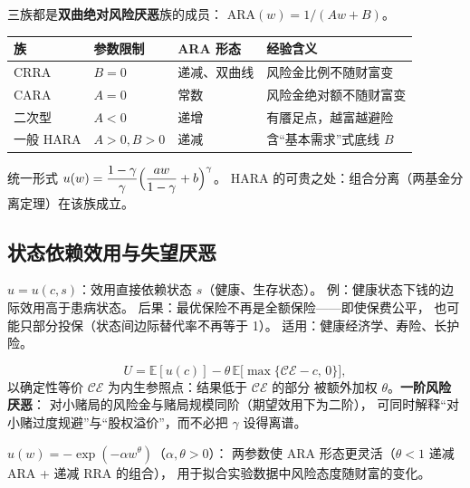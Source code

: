 三族都是\textbf{双曲绝对风险厌恶}族的成员：
$\mathrm{ARA}(w)=1/(Aw+B)$。
\begin{center}
\small
\begin{tabular}{llll}
\toprule
族 & 参数限制 & ARA 形态 & 经验含义 \\
\midrule
CRRA & $B=0$ & 递减、双曲线 & 风险金比例不随财富变 \\
CARA & $A=0$ & 常数 & 风险金绝对额不随财富变 \\
二次型 & $A<0$ & 递增 & 有餍足点，越富越避险 \\
一般 HARA & $A>0,B>0$ & 递减 & 含“基本需求”式底线 $B$ \\
\bottomrule
\end{tabular}
\end{center}
统一形式 $u(w)=\dfrac{1-\gamma}{\gamma}\Bigl(\dfrac{aw}{1-\gamma}+b\Bigr)^{\gamma}$。
HARA 的可贵之处：组合分离（两基金分离定理）在该族成立。

\subsection{状态依赖效用与失望厌恶}

$u=u(c,s)$：效用直接依赖状态 $s$（健康、生存状态）。
例：健康状态下钱的边际效用高于患病状态。
后果：最优保险不再是全额保险——即使保费公平，
也可能只部分投保（状态间边际替代率不再等于 1）。
适用：健康经济学、寿险、长护险。

\[
U=\mathbb{E}[u(c)]-\theta\,\mathbb{E}\bigl[\max\{\mathcal{CE}-c,\,0\}\bigr],
\]
以确定性等价 $\mathcal{CE}$ 为内生参照点：结果低于 $\mathcal{CE}$ 的部分
被额外加权 $\theta$。\textbf{一阶风险厌恶}：
对小赌局的风险金与赌局规模同阶（期望效用下为二阶），
可同时解释“对小赌过度规避”与“股权溢价”，而不必把 $\gamma$ 设得离谱。

$u(w)=-\exp(-\alpha w^{\theta})$（$\alpha,\theta>0$）：
两参数使 ARA 形态更灵活（$\theta<1$ 递减 ARA + 递减 RRA 的组合），
用于拟合实验数据中风险态度随财富的变化。
